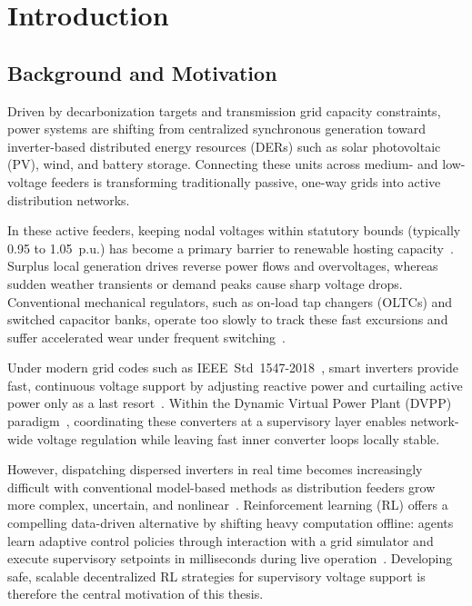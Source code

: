 \chapter{Introduction}
\label{ch:introduction}

\section{Background and Motivation}
Driven by decarbonization targets and transmission grid capacity constraints, power systems are shifting from centralized synchronous generation toward inverter-based distributed energy resources (DERs) such as solar photovoltaic (PV), wind, and battery storage. Connecting these units across medium- and low-voltage feeders is transforming traditionally passive, one-way grids into active distribution networks.

In these active feeders, keeping nodal voltages within statutory bounds (typically 0.95 to 1.05~p.u.) has become a primary barrier to renewable hosting capacity~\cite{Satsangi2022,Mughni2026}. Surplus local generation drives reverse power flows and overvoltages, whereas sudden weather transients or demand peaks cause sharp voltage drops. Conventional mechanical regulators, such as on-load tap changers (OLTCs) and switched capacitor banks, operate too slowly to track these fast excursions and suffer accelerated wear under frequent switching~\cite{Moutis2018,Satsangi2022}.

Under modern grid codes such as IEEE~Std~1547-2018~\cite{IEEE1547_2018}, smart inverters provide fast, continuous voltage support by adjusting reactive power and curtailing active power only as a last resort~\cite{Satsangi2022,Mughni2026}. Within the Dynamic Virtual Power Plant (DVPP) paradigm~\cite{Marinescu2022,Haberle2023,Schulte2026}, coordinating these converters at a supervisory layer enables network-wide voltage regulation while leaving fast inner converter loops locally stable.

However, dispatching dispersed inverters in real time becomes increasingly difficult with conventional model-based methods as distribution feeders grow more complex, uncertain, and nonlinear~\cite{Ortmann2020,Chen2022}. Reinforcement learning (RL) offers a compelling data-driven alternative by shifting heavy computation offline: agents learn adaptive control policies through interaction with a grid simulator and execute supervisory setpoints in milliseconds during live operation~\cite{Chen2022,Jacob2024,Chan2026}. Developing safe, scalable decentralized RL strategies for supervisory voltage support is therefore the central motivation of this thesis.

